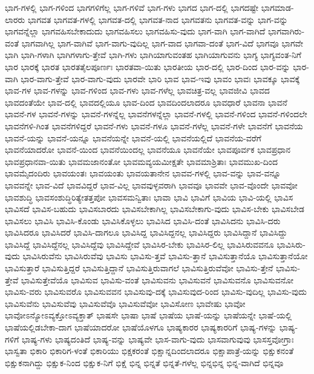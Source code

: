 {ಭಾಗ-ಗಳಲ್ಲಿ
ಭಾಗ-ಗಳಿಂದ
ಭಾಗಗಳಿಗೆಲ್ಲ
ಭಾಗ-ಗಳಿವೆ
ಭಾಗ-ಗಳು
ಭಾಗದ
ಭಾಗ-ದಲ್ಲಿ
ಭಾಗದಷ್ಟೇ
ಭಾಗಮಾಡ-ಲಾರರು
ಭಾಗವತ
ಭಾಗವತ-ಗಳಲ್ಲಿ
ಭಾಗವತ-ದಲ್ಲಿ
ಭಾಗವತ-ನಾದ
ಭಾಗವತನು
ಭಾಗವತ-ವನ್ನು
ಭಾಗ-ವನ್ನು
ಭಾಗವನ್ನೆಲ್ಲಾ
ಭಾಗವಹಿಸಬೇಕಾದುದು
ಭಾಗವಹಿಸಲು
ಭಾಗವಹಿಸು-ವುದು
ಭಾಗ-ವಾಗಿ
ಭಾಗ-ವಾಗಿದೆ
ಭಾಗವಾಗಿರು-ವಂತೆ
ಭಾಗವಾಗಿಲ್ಲ
ಭಾಗ-ವಾಗಿವೆ
ಭಾಗ-ವಾಗು-ವುದಿಲ್ಲ
ಭಾಗ-ವಾದ
ಭಾಗವಾ-ದಂತೆ
ಭಾಗ-ವಿದೆ
ಭಾಗವೂ
ಭಾಗವೇ
ಭಾಗಿ
ಭಾಗಿ-ಗಳಾಗಿ
ಭಾಗಿಗಳಾಗು-ತ್ತೇವೆ
ಭಾಗಿ-ಗಳು
ಭಾಗಿಯಾಗುವಂತಹ
ಭಾಗಿಯಾಗುವನು
ಭಾಗ್ಯ
ಭಾಗ್ಯವಂತ-ನಿಗೆ
ಭಾರ
ಭಾರಕ್ಕೆ
ಭಾರತ
ಭಾರತತೈಲಪೂರ್ಣಃ
ಭಾರತವಾ-ಯಿತು
ಭಾರತೀಯ
ಭಾರ-ದಲ್ಲಿ
ಭಾರ-ದಿಂದ
ಭಾರ-ವನ್ನು
ಭಾರ-ವಾಗಿ
ಭಾರ-ವಾಗು-ತ್ತೇವೆ
ಭಾರ-ವಾಗು-ವುದು
ಭಾರವೇ
ಭಾರಿ
ಭಾವ
ಭಾವ-ಇವು
ಭಾವಂ
ಭಾವಃ
ಭಾವಕ್ಕೂ
ಭಾವಕ್ಕೆ
ಭಾವ-ಗಳ
ಭಾವ-ಗಳನ್ನು
ಭಾವ-ಗಳಿಂದ
ಭಾವ-ಗಳು
ಭಾವ-ಗಳೆಲ್ಲ
ಭಾವಚಿತ್ರ-ವಲ್ಲ
ಭಾವಜೀವಿ
ಭಾವದ
ಭಾವದಂತೆಯೇ
ಭಾವ-ದಲ್ಲಿ
ಭಾವದಲ್ಲಿಯೂ
ಭಾವ-ದಿಂದ
ಭಾವದಿಂದಲಾದರೂ
ಭಾವಧಾರೆ
ಭಾವನಾ
ಭಾವನೆ
ಭಾವನೆ-ಗಳ
ಭಾವನೆ-ಗಳನ್ನು
ಭಾವನೆ-ಗಳನ್ನೆಲ್ಲ
ಭಾವನೆಗಳನ್ನೆಲ್ಲಾ
ಭಾವನೆ-ಗಳಲ್ಲಿ
ಭಾವನೆ-ಗಳಿಂದ
ಭಾವನೆ-ಗಳಿಂದಲೇ
ಭಾವನೆಗಳಿ-ಗಿಂತ
ಭಾವನೆಗಳಿದ್ದರೆ
ಭಾವನೆ-ಗಳು
ಭಾವನೆ-ಗಳೂ
ಭಾವನೆ-ಗಳೆಲ್ಲ
ಭಾವನೆ-ಗಳೇ
ಭಾವನೆಗೆ
ಭಾವನೆಯ
ಭಾವನೆ-ಯನ್ನು
ಭಾವನೆ-ಯನ್ನೂ
ಭಾವನೆಯನ್ನೇ
ಭಾವನೆ-ಯಲ್ಲಿ
ಭಾವನೆಯಲ್ಲಿದೆ
ಭಾವನೆಯ-ವರೆಗೆ
ಭಾವನೆಯಾದರೋ
ಭಾವನೆ-ಯಿಂದ
ಭಾವನೆಯಿಂದಲ್ಲ
ಭಾವನೆಯೂ
ಭಾವನೆಯೇ
ಭಾವಪೂರ್ವಕ
ಭಾವಪ್ರಧಾನ
ಭಾವಪ್ರಧಾನವಾ-ಯಿತು
ಭಾವಮಜಾನಂತೋ
ಭಾವಮವ್ಯಯಮೀಕ್ಷತೇ
ಭಾವಮಾಶ್ರಿತಾಃ
ಭಾವಮುಖ-ದಿಂದ
ಭಾವಮೈದಂದಿರು
ಭಾವಯಂತಃ
ಭಾವಯಂತು
ಭಾವಯತಾನೇನ
ಭಾವವ-ಗಳಲ್ಲಿ
ಭಾವ-ವನ್ನು
ಭಾವ-ವನ್ನೂ
ಭಾವವನ್ನೇ
ಭಾವ-ವಿದೆ
ಭಾವವಿದ್ದರೆ
ಭಾವ-ವಿಲ್ಲ
ಭಾವವುಳ್ಳವರಾಗಿ
ಭಾವವೂ
ಭಾವವೇ
ಭಾವ-ವೊಂದೇ
ಭಾವವೋ
ಭಾವಶುದ್ಧಿ
ಭಾವಸಂಶುದ್ಧಿರಿತ್ಯೇತತ್ತಪೋ
ಭಾವಸಮನ್ವಿತಾಃ
ಭಾವಾ
ಭಾವಿ
ಭಾವಿಗೆ
ಭಾವಿಯ
ಭಾವಿ-ಯಲ್ಲಿ
ಭಾವಿಸ
ಭಾವಿಸದೆ
ಭಾವಿಸ-ಬಹುದು
ಭಾವಿಸಬಾರದು
ಭಾವಿಸಬೇಕಾಗಿಲ್ಲ
ಭಾವಿಸಬೇಕಾಗು-ವುದು
ಭಾವಿಸ-ಬೇಕು
ಭಾವಿಸಬೇಡ
ಭಾವಿಸಲು
ಭಾವಿಸಿ
ಭಾವಿಸಿ-ಕೊಂಡು
ಭಾವಿಸಿಕೊಳ್ಳಲು
ಭಾವಿಸಿದ
ಭಾವಿಸಿ-ದಂತೆ
ಭಾವಿಸಿದನು
ಭಾವಿಸಿ-ದರು
ಭಾವಿಸಿದರೂ
ಭಾವಿಸಿದರೆ
ಭಾವಿಸಿ-ದಾಗಲೂ
ಭಾವಿಸಿದ್ದ
ಭಾವಿಸಿದ್ದನಲ್ಲ
ಭಾವಿಸಿದ್ದರು
ಭಾವಿಸಿದ್ದಾನೆ
ಭಾವಿಸಿದ್ದು
ಭಾವಿಸಿದ್ದೆ
ಭಾವಿಸಿದ್ದೆನಲ್ಲ
ಭಾವಿಸಿದ್ದೆವು
ಭಾವಿಸಿದ್ದೇವೆ
ಭಾವಿಸಿರ-ಬೇಕು
ಭಾವಿಸಿರ-ಲಿಲ್ಲ
ಭಾವಿಸಿರುವವನೂ
ಭಾವಿಸಿರು-ವುದು
ಭಾವಿಸಿರುವೆನು
ಭಾವಿಸಿರುವೆವು
ಭಾವಿಸು
ಭಾವಿಸು-ತ್ತವೆ
ಭಾವಿಸು-ತ್ತಾನೆ
ಭಾವಿಸುತ್ತಾನೆಯೊ
ಭಾವಿಸುತ್ತಾನೆಯೋ
ಭಾವಿಸುತ್ತಾರೆ
ಭಾವಿಸುತ್ತಿದ್ದರೆ
ಭಾವಿಸುತ್ತಿದ್ದಾನೆ
ಭಾವಿಸುತ್ತಿರುವಾಗಲೆ
ಭಾವಿಸುತ್ತಿರುವೆವೋ
ಭಾವಿಸು-ತ್ತೇನೆ
ಭಾವಿಸು-ತ್ತೇವೆ
ಭಾವಿಸುತ್ತೇವೆಯೊ
ಭಾವಿಸುವ
ಭಾವಿಸು-ವಂತೆ
ಭಾವಿಸುವನು
ಭಾವಿಸುವನೆ
ಭಾವಿಸುವನೊ
ಭಾವಿಸುವನೋ
ಭಾವಿಸು-ವರು
ಭಾವಿಸುವರೊ
ಭಾವಿಸುವವನ
ಭಾವಿಸುವು-ದಕ್ಕೆ
ಭಾವಿಸುವುದ-ರಿಂದ
ಭಾವಿಸು-ವುದಿಲ್ಲ
ಭಾವಿಸು-ವುದು
ಭಾವಿಸುವೆನು
ಭಾವಿಸುವೆವು
ಭಾವಿಸುವೆವೊ
ಭಾವಿಸುವೆವೋ
ಭಾವಿಸೋಣ
ಭಾವೇಷು
ಭಾವೋ
ಭಾವೋಽನ್ಯೋಽವ್ಯಕ್ತೋಽವ್ಯಕ್ತಾತ್
ಭಾಷಸೇ
ಭಾಷಾ
ಭಾಷೆ
ಭಾಷೆಯ
ಭಾಷೆ-ಯನ್ನು
ಭಾಷೆಯನ್ನೇ
ಭಾಷೆ-ಯಲ್ಲಿ
ಭಾಷೆಯಲ್ಲಿಡಬೇಕಾ-ದಾಗ
ಭಾಷೆಯಾದರೋ
ಭಾಷೆಯೊಳಗೂ
ಭಾಷ್ಯಕಾರರ
ಭಾಷ್ಯಕಾರರಿಗೆ
ಭಾಷ್ಯ-ಗಳನ್ನು
ಭಾಷ್ಯ-ಗಳಿಗೆ
ಭಾಷ್ಯ-ಗಳು
ಭಾಷ್ಯದಂತಿದೆ
ಭಾಷ್ಯ-ವನ್ನು
ಭಾಷ್ಯವೇ
ಭಾಸ-ವಾಗು-ವುದು
ಭಾಸವಾಗುವುವು
ಭಾಸಸ್ತವೋಗ್ರಾಃ
ಭಾಸ್ವತಾ
ಭಿಕಾರಿ
ಭಿಕಾರಿಗ-ಳಂತೆ
ಭಿಕಾರಿಯು
ಭಿಕ್ಷಕರಂತೆ
ಭಿಕ್ಷಾನ್ನದಿಂದಲಾದರೂ
ಭಿಕ್ಷಾಪಾತ್ರೆ-ಯನ್ನು
ಭಿಕ್ಷುಕನಂತೆ
ಭಿಕ್ಷುಕನಾಗಿದ್ದು
ಭಿಕ್ಷುಕ-ನಿಂದ
ಭಿಕ್ಷುಕ-ನಿಗೆ
ಭಿಕ್ಷೆ
ಭಿನ್ನ
ಭಿನ್ನತೆ
ಭಿನ್ನತೆ-ಗಳೆಲ್ಲ
ಭಿನ್ನಭಿನ್ನ
ಭಿನ್ನ-ವಾಗಿದೆ
ಭಿನ್ನವೂ
}
